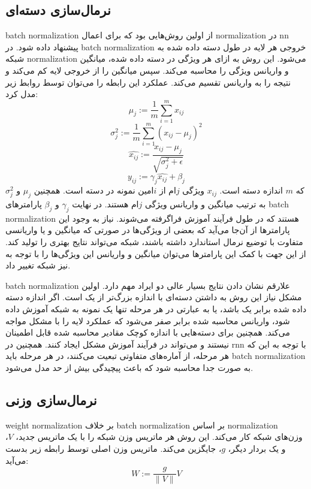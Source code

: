 \subsection{نرمال‌سازی دسته‌ای}
\gls{batch normalization}\cite{ioffe2015batch} از اولین روش‌هایی بود که برای
اعمال \gls{normalization} در \gls{nn} پیشنهاد داده شود. در \gls{batch
normalization} خروجی هر لایه در طول دسته داده شده به شبکه \gls{normalization}
می‌شود. این روش به ازای هر ویژگی در دسته داده شده، میانگین و واریانس ویژگی را
محاسبه می‌کند. سپس میانگین را از خروجی لایه کم می‌کند و نتیجه را به واریانس
تقسیم می‌کند. عملکرد این رابطه را می‌توان توسط روابط زیر مدل کرد:
\begin{equation}
    \mu_j := \frac{1}{m} \sum_{i=1}^{m}x_{ij}
\end{equation}
\begin{equation}
    \sigma_j^2 := \frac{1}{m} \sum_{i=1}^{m}(x_{ij} - \mu_j)^2
\end{equation}
\begin{equation}
    \hat{x_{ij}} := \frac{x_{ij} - \mu_j}{\sqrt{\sigma_j^2 + \epsilon}}
\end{equation}
\begin{equation}
    y_{ij} := \gamma_j \hat{x_{ij}} + \beta_j
\end{equation}
که $m$ اندازه دسته است. $x_{ij}$ ویژگی $j$ام از $i$امین نمونه در دسته است.
همچنین $\mu_j$ و $\sigma_j^2$ به ترتیب میانگین و واریانس ویژگی $j$ام هستند. در
نهایت $\gamma_j$ و $\beta_j$ پارامترهای \gls{batch normalization} هستند که در
طول فرآیند آموزش فراگرفته می‌شوند. نیاز به وجود این پارامترها از آن‌جا می‌آید که
بعضی از ویژگی‌ها در صورتی که میانگین و یا واریانسی متفاوت با توضیع نرمال
استاندارد داشته باشند، شبکه می‌تواند نتایج بهتری را تولید کند. از این جهت با کمک
این پارامترها می‌توان میانگین و واریانس این ویژگی‌ها را با توجه به نیز شبکه
تغییر داد.

\gls{batch normalization} علارقم نشان دادن نتایج بسیار عالی دو ایراد مهم دارد.
اولین مشکل نیاز این روش به داشتن دسته‌ای با اندازه بزرگ‌تر از یک است. اگر اندازه
دسته داده شده برابر یک باشد، یا به عبارتی در هر مرحله تنها یک نمونه به شبکه
آموزش داده شود، واریانس محاسبه شده برابر صفر می‌شود که عملکرد لایه را با مشکل
مواجه می‌کند. همچنین برای دسته‌هایی با اندازه کوچک مقادیر محاسبه شده قابل
اطمینان نیستند و می‌تواند در فرآیند آموزش مشکل ایجاد کنند. همچنین در \gls{rnn}
با توجه به این که هر مرحله، از آماره‌های متفاوتی تبعیت می‌کنند، در هر مرحله باید
\gls{batch normalization} به صورت جدا محاسبه شود که باعث پیچیدگی بیش از حد مدل
می‌شود.

\subsection{نرمال‌سازی وزنی}
\gls{weight normalization}\cite{salimans2016weight} بر خلاف \gls{batch
normalization} بر اساس \gls{normalization} وزن‌های شبکه کار می‌کند. این روش هر
ماتریس وزن شبکه را با یک ماتریس جدید، $V$، و یک بردار دیگر، $g$، جایگزین می‌کند.
ماتریس وزن اصلی توسط رابطه زیر بدست می‌آید:
\begin{equation}
    W := \frac{g}{\parallel V \parallel} V
\end{equation}

